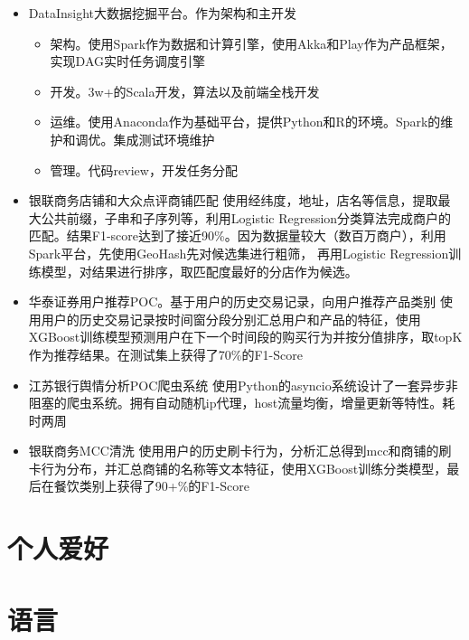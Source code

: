 \documentclass[11pt,a4paper,sans]{moderncv}        %
\begin{document}
 {
\begin{itemize}
	\item DataInsight大数据挖掘平台。作为架构和主开发
		\begin{itemize}
			\item 架构。使用Spark作为数据和计算引擎，使用Akka和Play作为产品框架，实现DAG实时任务调度引擎
			\item 开发。3w+的Scala开发，算法以及前端全栈开发
			\item 运维。使用Anaconda作为基础平台，提供Python和R的环境。Spark的维护和调优。集成测试环境维护
			\item 管理。代码review，开发任务分配
		\end{itemize}
	\item 银联商务店铺和大众点评商铺匹配
	\newline{}
	使用经纬度，地址，店名等信息，提取最大公共前缀，子串和子序列等，利用Logistic Regression分类算法完成商户的匹配。结果F1-score达到了接近90\%。因为数据量较大（数百万商户），利用Spark平台，先使用GeoHash先对候选集进行粗筛， 再用Logistic Regression训练模型，对结果进行排序，取匹配度最好的分店作为候选。
	\item 华泰证券用户推荐POC。基于用户的历史交易记录，向用户推荐产品类别
	\newline{}
	使用用户的历史交易记录按时间窗分段分别汇总用户和产品的特征，使用XGBoost训练模型预测用户在下一个时间段的购买行为并按分值排序，取topK作为推荐结果。在测试集上获得了70\%的F1-Score
	\item 江苏银行舆情分析POC爬虫系统
	\newline{}
	使用Python的asyncio系统设计了一套异步非阻塞的爬虫系统。拥有自动随机ip代理，host流量均衡，增量更新等特性。耗时两周
	\item 银联商务MCC清洗
	\newline{}
	使用用户的历史刷卡行为，分析汇总得到mcc和商铺的刷卡行为分布，并汇总商铺的名称等文本特征，使用XGBoost训练分类模型，最后在餐饮类别上获得了90+\%的F1-Score
\end{itemize}
}

	
\section{个人爱好}

\section{语言}

\clearpage
\end{document}
